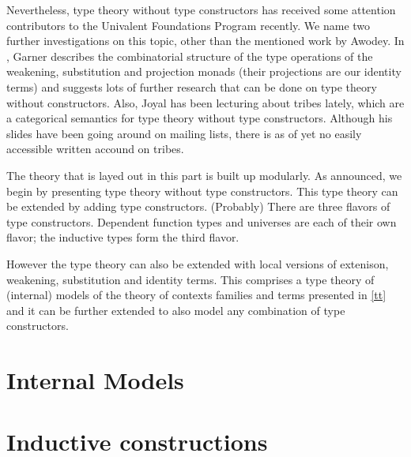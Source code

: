 \documentclass{article}
\begin{document}
Nevertheless, type theory without type constructors has received some attention
contributors to the Univalent Foundations Program recently. We name two
further investigations on this topic, other than the mentioned work by Awodey.
In \cite{Garner2014}, Garner describes the combinatorial structure
of the type operations of the weakening, substitution and projection monads
(their projections are our identity terms) and suggests lots of further research
that can be done on type theory without constructors. Also, Joyal has been
lecturing about tribes lately, which are a categorical semantics for type theory
without type constructors. Although his slides have been going around on
mailing lists, there is as of yet no easily accessible written accound on tribes.

The theory that is layed out in this part is built up modularly. As announced,
we begin by presenting type theory without type constructors. This type theory
can be extended by adding type constructors. (Probably) There are three flavors
of type constructors. Dependent function types and universes are each of their
own flavor; the inductive types form the third flavor.

However the type theory can also be extended with local versions of extenison,
weakening, substitution and identity terms. This comprises a type theory of
(internal) models of the theory of contexts families and terms presented in
\autoref{tt} and it can be further extended to also model any combination of
type constructors.







\part{Internal Models}







\part{Inductive constructions}





%

%

%



\end{document}
